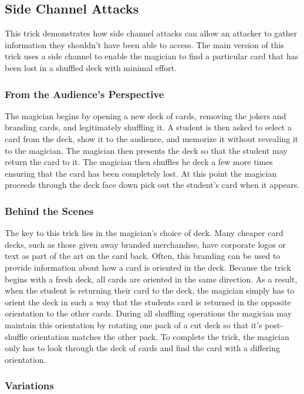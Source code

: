 \subsection{Side Channel Attacks}

This trick demonstrates how side channel attacks can allow an attacker to
gather information they shouldn't have been able to access.
The main version of this trick uses a side channel to enable the magician to
find a particular card that has been lost in a shuffled deck with minimal
effort.

\subsubsection{From the Audience's Perspective}

The magician begins by opening a new deck of cards, removing the jokers and
branding cards, and legitimately shuffling it.  A student is then asked to
select a card from the deck, show it to the audience, and memorize it without
revealing it to the magician.
The magician then presents the deck so that the student may return
the card to it.
The magician then shuffles he deck a few more times ensuring that the card has
been completely lost.
At this point the magician proceeds through the deck face down pick out the
student's card when it appears.

\subsubsection{Behind the Scenes}

The key to this trick lies in the magician's choice of deck.  Many cheaper card
decks, such as those given away branded merchandise, have corporate logos or
text as part of the art on the card back.  Often, this branding can be used to
provide information about how a card is oriented in the deck.  Because the trick
begins with a fresh deck, all cards are oriented in the same direction.  As a
result, when the student is returning their card to the deck, the magician
simply has to orient the deck in such a way that the students card is returned
in the opposite orientation to the other cards.  During all shuffling
operations the magician may maintain this orientation by rotating one pack of a
cut deck so that it's post-shuffle orientation matches the other pack.
To complete the trick, the magician only has to look through the deck of cards
and find the card with a differing orientation.

\subsubsection{Variations}


